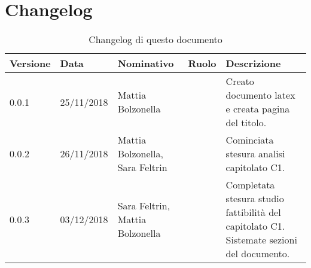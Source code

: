 \section{Changelog}
\begin{table}[tbph]
        \centering
        \begin{tabularx}{\textwidth}{|l|l|l|l|X|}
                \hline
                \textbf{Versione} & \textbf{Data} & \textbf{Nominativo}  & \textbf{Ruolo} & \textbf{Descrizione}\\
              \hline \hline
              0.0.1 & 25/11/2018 & Mattia Bolzonella & & Creato documento latex e creata pagina del titolo. \\
              \hline
              0.0.2 & 26/11/2018 & Mattia Bolzonella, Sara Feltrin & &Cominciata stesura analisi capitolato C1.\\
              \hline
              0.0.3 & 03/12/2018 & Sara Feltrin, Mattia Bolzonella & &Completata stesura studio fattibilità del capitolato C1. Sistemate sezioni del documento. \\
              \hline
        \end{tabularx}
        \caption{Changelog di questo documento}
\end{table}